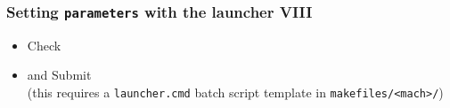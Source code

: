 \documentclass[9pt]{beamer}
\begin{document}
{
\begin{frame}[fragile]
  \frametitle{Setting {\tt parameters} with the launcher VIII}

\vspace{6.25cm}

\begin{block}{}
\begin{itemize}
\item Check
\item and Submit\\
(this requires a {\tt launcher.cmd} batch script template in \verb|makefiles/<mach>/|)
\end{itemize}
\end{block}

\end{frame}
}

\end{document}
